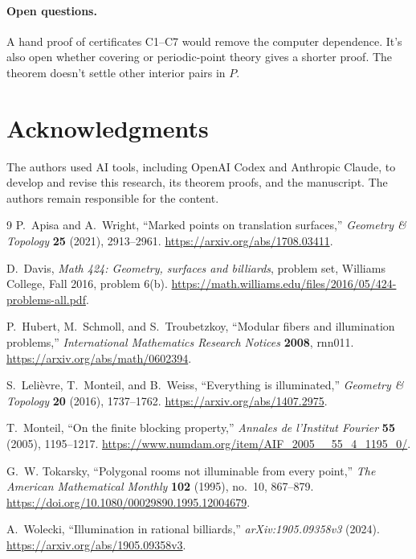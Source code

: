 \documentclass[11pt]{article}
\theoremstyle{remark}
\begin{document}
\paragraph{Open questions.} A hand proof of certificates C1--C7 would remove the computer dependence. It's also open whether covering or periodic-point theory gives a shorter proof. The theorem doesn't settle other interior pairs in $P$.

\section*{Acknowledgments}
The authors used AI tools, including OpenAI Codex and Anthropic Claude, to develop and revise this research, its theorem proofs, and the manuscript. The authors remain responsible for the content.

\begin{thebibliography}{9}
P.~Apisa and A.~Wright, ``Marked points on translation surfaces,''
\emph{Geometry \& Topology} \textbf{25} (2021), 2913--2961.
\url{https://arxiv.org/abs/1708.03411}.

D.~Davis, \emph{Math 424: Geometry, surfaces and billiards}, problem set, Williams College, Fall 2016, problem 6(b).
\url{https://math.williams.edu/files/2016/05/424-problems-all.pdf}.

P.~Hubert, M.~Schmoll, and S.~Troubetzkoy, ``Modular fibers and illumination problems,''
\emph{International Mathematics Research Notices} \textbf{2008}, rnn011.
\url{https://arxiv.org/abs/math/0602394}.

S.~Lelièvre, T.~Monteil, and B.~Weiss, ``Everything is illuminated,''
\emph{Geometry \& Topology} \textbf{20} (2016), 1737--1762.
\url{https://arxiv.org/abs/1407.2975}.

T.~Monteil, ``On the finite blocking property,''
\emph{Annales de l'Institut Fourier} \textbf{55} (2005), 1195--1217.
\url{https://www.numdam.org/item/AIF_2005__55_4_1195_0/}.

G.~W. Tokarsky, ``Polygonal rooms not illuminable from every point,''
\emph{The American Mathematical Monthly} \textbf{102} (1995), no.~10, 867--879.
\url{https://doi.org/10.1080/00029890.1995.12004679}.

A.~Wolecki, ``Illumination in rational billiards,''
\emph{arXiv:1905.09358v3} (2024).
\url{https://arxiv.org/abs/1905.09358v3}.
\end{thebibliography}
\end{document}
